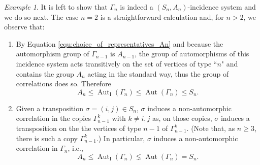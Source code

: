 \documentclass{amsart}
\theoremstyle{definition}
\theoremstyle{remark}
\newtheorem{example}[theorem]{Example}
\newcommand{\Aut}{\operatorname{Aut}}
\newcommand{\AutI}{\Aut_{\text{I}}}
\begin{document}
\begin{example}
It is left to show that $\Gamma_n$ is indeed a $(S_n,A_n)$-incidence system and we do so next. The case $n=2$ is a straightforward calculation and, for $n>2$, we observe that:
\begin{enumerate}[label={\rm (\alph{*})}]

    \item By Equation \eqref{equ:choice_of_representatives_An} and because the automorphism group of $\Gamma_{n-1}$ is $A_{n-1}$, the group of automorphisms of this incidence system acts transitively on the set of vertices of type ``$n$" and contains the group $A_n$ acting in the standard way, thus the group of correlations does so. Therefore
    $$A_n\leq \AutI(\Gamma_n)\leq\Aut(\Gamma_n)\leq S_n.$$

    \item Given a transposition $\sigma=(i,j)\in S_n$, $\sigma$ induces a non-automorphic correlation in the copies $\Gamma^k_{n-1}$ with $k\neq i,j$ as, on those copies, $\sigma$ induces a transposition on the the vertices of type $n-1$ of $\Gamma_{n-1}^k$. (Note that, as $n\geq 3$, there is such a copy $\Gamma_{n-1}^k$.) In particular, $\sigma$ induces a non-automorphic correlation in $\Gamma_n$, i.e., 
    $$A_n\leq \AutI(\Gamma_n)\lneq\Aut(\Gamma_n)= S_n.$$
\end{enumerate} 
\end{example}


\end{document}
